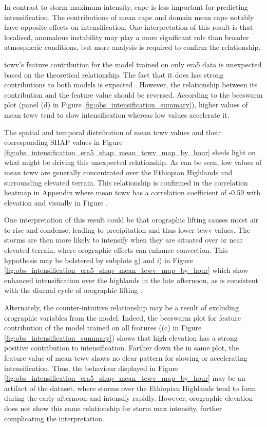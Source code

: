 In contrast to storm maximum intensity, \acrshort{cape} is less important for predicting intensification. The contributions of mean \acrshort{cape} and domain mean \acrshort{cape} notably have opposite effects on intensification. One interpretation of this result is that localised, anomalous instability may play a more significant role than broader atmospheric conditions, but more analysis is required to confirm the relationship.

\acrfull{tcwv}'s feature contribution for the model trained on only \acrshort{era5} data is unexpected based on the theoretical relationship. The fact that it does has strong contributions to both models is expected \citep{Li2023,Muetzelfeldt2025,Klein2020}. However, the relationship between its contribution and the feature value should be reversed. According to the beeswarm plot (panel (d) in Figure \ref{fig:obs_intensification_summary}), higher values of mean \acrshort{tcwv} tend to slow intensification whereas low values accelerate it.

The spatial and temporal distribution of mean \acrshort{tcwv} values and their corresponding SHAP values in Figure \ref{fig:obs_intensification_era5_shap_mean_tcwv_map_by_hour} sheds light on what might be driving this unexpected relationship. As can be seen, low values of mean \acrshort{tcwv} are generally concentrated over the Ethiopian Highlands and surrounding elevated terrain. This relationship is confirmed in the correlation heatmap in Appendix  where mean \acrshort{tcwv} has a correlation coefficient of -0.59 with elevation and visually in Figure .

One interpretation of this result could be that orographic lifting causes moist air to rise and condense, leading to precipitation and thus lower \acrshort{tcwv} values. The storms are then more likely to intensify when they are situated over or near elevated terrain, where orographic effects can enhance convection. This hypothesis may be bolstered by subplots g) and i) in Figure \ref{fig:obs_intensification_era5_shap_mean_tcwv_map_by_hour} which show enhanced intensification over the highlands in the late afternoon, as is consistent with the diurnal cycle of orographic lifting \citep{Colle2015,Negash2024,Zardi2013}.

Alternately, the counter-intuitive relationship may be a result of excluding orographic variables from the model. Indeed, the beeswarm plot for feature contribution of the model trained on all features ((c) in Figure \ref{fig:obs_intensification_summary}) shows that high elevation has a strong positive contribution to intensification. Farther down the in same plot, the feature value of mean \acrshort{tcwv} shows no clear pattern for slowing or accelerating intensification. Thus, the behaviour displayed in Figure \ref{fig:obs_intensification_era5_shap_mean_tcwv_map_by_hour} may be an artifact of the dataset, where storms over the Ethiopian Highlands tend to form during the early afternoon and intensify rapidly. However, orographic elevation does not show this same relationship for storm max intensity, further complicating the interpretation.

